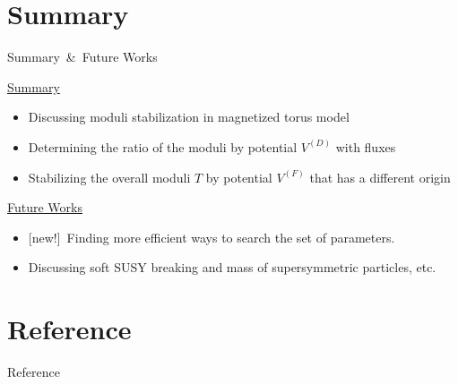 \documentclass[
  unicode,a4paper,10pt,
  xcolor = {dvipsnames,svgnames},
  hyperref ={colorlinks=true,citecolor=Navy,linkcolor=NavyBlue,urlcolor=purple},
  ja=standard,lualatex
]{beamer}
\renewcommand{\theequation}{\thesection.\arabic{equation}}
\renewcommand{\thefigure}{\thesection.\arabic{figure}}
\renewcommand{\thetable}{\thesection.\arabic{table}}
\begin{document}
\section{Summary}


\begin{frame}{Summary\ \&\ Future Works}

  \uline{Summary}
  \begin{itemize}
    \item
          Discussing moduli stabilization in magnetized torus model
    \item
          Determining the ratio of the moduli by potential $V^{(D)}$ with fluxes
    \item
          Stabilizing the overall moduli $T$ by potential $V^{(F)}$ that has a different origin
  \end{itemize}

  \uline{Future Works}
  \begin{itemize}
    \item
          {[new!]}\ Finding more efficient ways to search the set of parameters.
    \item
          Discussing soft SUSY breaking and mass of supersymmetric particles, etc.
  \end{itemize}

\end{frame}



\setcounter{Appendix}{\value{framenumber}}
\setcounter{section}{0}
\renewcommand{\thesubsection}{\Alph{subsection}}
\makeatletter
\renewcommand{\theequation}{\thesubsection.\arabic{equation}}

\renewcommand{\thefigure}{\thesubsection.\arabic{figure}}

\renewcommand{\thetable}{\thesubsection.\arabic{table}}
\makeatother













\nocite{Wess:1992}

\section{Reference}
\begin{frame}{Reference}

  \scriptsize
  \beamertemplatetextbibitems
  
  

\end{frame}

\setcounter{framenumber}{\value{Appendix}}
\end{document}
